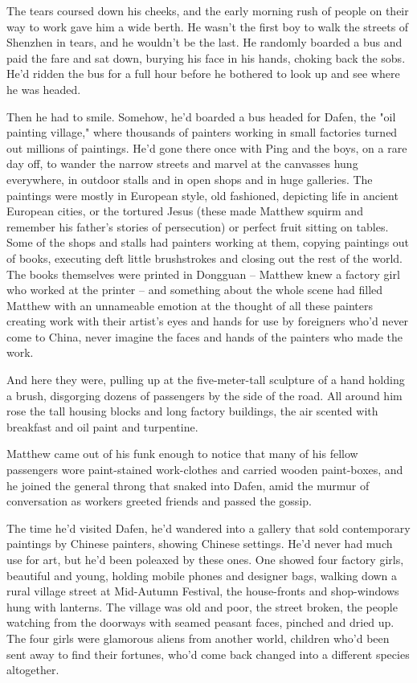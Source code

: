 The tears coursed down his cheeks, and the early morning rush of
people on their way to work gave him a wide berth. He wasn't the
first boy to walk the streets of Shenzhen in tears, and he wouldn't
be the last. He randomly boarded a bus and paid the fare and sat
down, burying his face in his hands, choking back the sobs. He'd
ridden the bus for a full hour before he bothered to look up and
see where he was headed.

Then he had to smile. Somehow, he'd boarded a bus headed for Dafen,
the "oil painting village," where thousands of painters working in
small factories turned out millions of paintings. He'd gone there
once with Ping and the boys, on a rare day off, to wander the
narrow streets and marvel at the canvasses hung everywhere, in
outdoor stalls and in open shops and in huge galleries. The
paintings were mostly in European style, old fashioned, depicting
life in ancient European cities, or the tortured Jesus (these made
Matthew squirm and remember his father's stories of persecution) or
perfect fruit sitting on tables. Some of the shops and stalls had
painters working at them, copying paintings out of books, executing
deft little brushstrokes and closing out the rest of the world. The
books themselves were printed in Dongguan -- Matthew knew a factory
girl who worked at the printer -- and something about the whole
scene had filled Matthew with an unnameable emotion at the thought
of all these painters creating work with their artist's eyes and
hands for use by foreigners who'd never come to China, never
imagine the faces and hands of the painters who made the work.

And here they were, pulling up at the five-meter-tall sculpture of
a hand holding a brush, disgorging dozens of passengers by the side
of the road. All around him rose the tall housing blocks and long
factory buildings, the air scented with breakfast and oil paint and
turpentine.

Matthew came out of his funk enough to notice that many of his
fellow passengers wore paint-stained work-clothes and carried
wooden paint-boxes, and he joined the general throng that snaked
into Dafen, amid the murmur of conversation as workers greeted
friends and passed the gossip.

The time he'd visited Dafen, he'd wandered into a gallery that sold
contemporary paintings by Chinese painters, showing Chinese
settings. He'd never had much use for art, but he'd been poleaxed
by these ones. One showed four factory girls, beautiful and young,
holding mobile phones and designer bags, walking down a rural
village street at Mid-Autumn Festival, the house-fronts and
shop-windows hung with lanterns. The village was old and poor, the
street broken, the people watching from the doorways with seamed
peasant faces, pinched and dried up. The four girls were glamorous
aliens from another world, children who'd been sent away to find
their fortunes, who'd come back changed into a different species
altogether.

